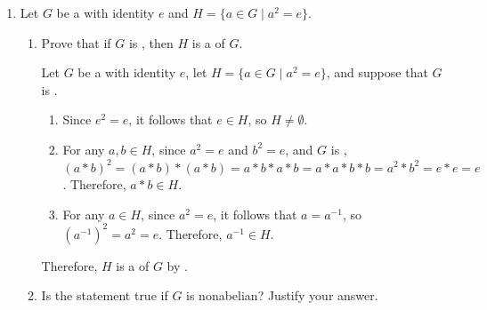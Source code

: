 \begin{enumerate}
\begin{enumerate}
    \begin{subdisprove}
      Note that \((\setZ_{4}, +)\) is a  since \((\setZ_{4}, +) = ([1])\).
      However, \(V_{4}\) is not  as shown in previous problem above.
      Since  is preserved under isomorphism, it follows that \(V_{4}\) is not isomorphic to \((\setZ_{4}, +)\).
    \end{subdisprove}
    \item \((\setZ_{6}, +)\) is isomorphic to \(S_{3}\).
    \begin{subdisprove}
      Note that \((\setZ_{6}, +)\) is a  since addition of integers modulo \(6\) is commutative.
      However, \(S_{3}\) is not  as shown earlier.
      Since  is preserved under isomorphism, it follows that \((\setZ_{6}, +)\) is not isomorphic to \(S_{3}\).
    \end{subdisprove}
  \end{enumerate}
  \item Let \(G\) be a  with identity \(e\) and \(H = \{a \in G \mid a^{2} = e\}\).
  \begin{enumerate}
    \item Prove that if \(G\) is , then \(H\) is a  of \(G\).
    \begin{subprove}
      Let \(G\) be a  with identity \(e\), let \(H = \{a \in G \mid a^{2} = e\}\), and suppose that \(G\) is .
      \begin{enumerate}
        \item Since \(e^{2} = e\), it follows that \(e \in H\), so \(H \neq \emptyset\).
        \item For any \(a, b \in H\), since \(a^{2} = e\) and \(b^{2} = e\), and \(G\) is , \((a * b)^{2} = (a * b) * (a * b) = a * b * a * b = a * a * b * b = a^{2} * b^{2} = e * e = e\). Therefore, \(a * b \in H\).
        \item For any \(a \in H\), since \(a^{2} = e\), it follows that \(a = a^{-1}\), so \((a^{-1})^{2} = a^{2} = e\). Therefore, \(a^{-1} \in H\).
      \end{enumerate}
      Therefore, \(H\) is a  of \(G\) by .
    \end{subprove}
    \item Is the statement true if \(G\) is nonabelian? Justify your answer.

\end{enumerate}
\end{enumerate}
